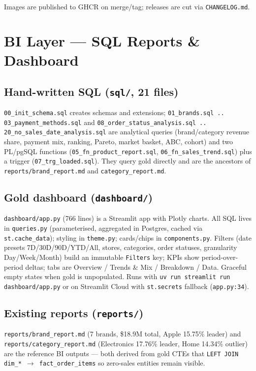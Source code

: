 \documentclass[11pt,a4paper]{article}
\begin{document}
Images are published to GHCR on merge/tag; releases are cut via \texttt{CHANGELOG.md}.

\section{BI Layer — SQL Reports \& Dashboard}

\subsection{Hand-written SQL (\texttt{sql/}, 21 files)}
\texttt{00\_init\_schema.sql} creates schemas and extensions; \texttt{01\_brands.sql .. 03\_payment\_methods.sql} and \texttt{08\_order\_status\_analysis.sql .. 20\_no\_sales\_date\_analysis.sql} are analytical queries (brand/category revenue share, payment mix, ranking, Pareto, market basket, ABC, cohort) and two PL/pgSQL functions (\texttt{05\_fn\_product\_report.sql}, \texttt{06\_fn\_sales\_trend.sql}) plus a trigger (\texttt{07\_trg\_loaded.sql}). They query gold directly and are the ancestors of \texttt{reports/brand\_report.md} and \texttt{category\_report.md}.

\subsection{Gold dashboard (\texttt{dashboard/})}
\texttt{dashboard/app.py} (766 lines) is a Streamlit app with Plotly charts. All SQL lives in \texttt{queries.py} (parameterised, aggregated in Postgres, cached via \texttt{st.cache\_data}); styling in \texttt{theme.py}; cards/chips in \texttt{components.py}. Filters (date presets 7D/30D/90D/YTD/All, stores, categories, order statuses, granularity Day/Week/Month) build an immutable \texttt{Filters} key; KPIs show period-over-period deltas; tabs are Overview / Trends \& Mix / Breakdown / Data. Graceful empty states when gold is unpopulated. Runs with \texttt{uv run streamlit run dashboard/app.py} or on Streamlit Cloud with \texttt{st.secrets} fallback (\texttt{app.py:34}).

\subsection{Existing reports (\texttt{reports/})}
\texttt{reports/brand\_report.md} (7 brands, \$18.9M total, Apple 15.75\% leader) and \texttt{reports/category\_report.md} (Electronics 17.76\% leader, Home 14.34\% outlier) are the reference BI outputs — both derived from gold CTEs that \texttt{LEFT JOIN dim\_* $\rightarrow$ fact\_order\_items} so zero-sales entities remain visible.
\end{document}
